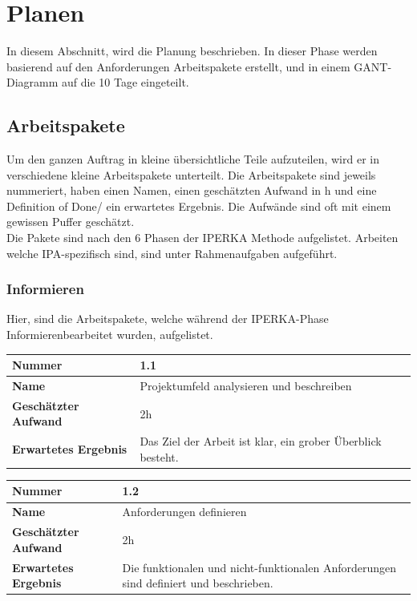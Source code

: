 \chapter{Planen}\label{ch:planen}
In diesem Abschnitt, wird die Planung beschrieben. In dieser Phase werden basierend auf den Anforderungen Arbeitspakete erstellt, und in einem GANT-Diagramm auf die 10 Tage eingeteilt.

\section{Arbeitspakete}

Um den ganzen Auftrag in kleine übersichtliche Teile aufzuteilen, wird er in verschiedene kleine Arbeitspakete unterteilt. Die Arbeitspakete sind jeweils nummeriert, haben einen Namen, einen geschätzten Aufwand in h und eine \flqq Definition of Done\frqq{}/ ein erwartetes Ergebnis. Die Aufwände sind oft mit einem gewissen Puffer geschätzt.\\
Die Pakete  sind nach den 6 Phasen der IPERKA Methode aufgelistet. Arbeiten welche IPA-spezifisch sind, sind unter Rahmenaufgaben aufgeführt.

\subsection{Informieren}
Hier, sind die Arbeitspakete, welche während der IPERKA-Phase \flqq Informieren\frqq{}\space bearbeitet wurden, aufgelistet.

\begin{longtable}{p{}|p{}}
	\hline
	\textbf{Nummer}    				& 1.1 \\
	\hline
	\textbf{Name}   				& Projektumfeld analysieren und beschreiben \\
	\hline
	\textbf{Geschätzter Aufwand}	& 2h \\
	\hline
	\textbf{Erwartetes Ergebnis}	& Das Ziel der Arbeit ist klar, ein grober Überblick besteht. \\
	\hline
\end{longtable}

\begin{longtable}{p{}|p{}}
	\hline
	\textbf{Nummer}    				& 1.2 \\
	\hline
	\textbf{Name}   				& Anforderungen definieren \\
	\hline
	\textbf{Geschätzter Aufwand}	& 2h \\
	\hline
	\textbf{Erwartetes Ergebnis}	& Die funktionalen und nicht-funktionalen Anforderungen sind definiert und beschrieben.\\
	\hline
\end{longtable}\pagebreak

